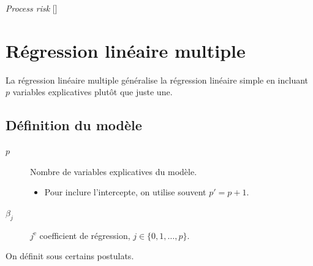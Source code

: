 \documentclass[french]{article}
\begin{document}
\begin{multicols*}{2}
\begin{definitionGENERAL}{\og \textit{Process risk} \fg{}}[]
\begin{center}
\end{center}
\end{definitionGENERAL}




\newpage
\section{Régression linéaire multiple}\label{sec:MLR}
\begin{rappel_enhanced}[Contexte]
La régression linéaire multiple généralise la régression linéaire simple en incluant $p$ variables explicatives plutôt que juste une.
\end{rappel_enhanced}


\subsection{Définition du modèle}
\begin{distributions}[Notation]
\begin{description}
	\item[$p$]	Nombre de variables explicatives du modèle.
		\begin{itemize}
		\item	Pour inclure l'intercepte, on utilise souvent $p' = p + 1$.
		\end{itemize}
	\item[$\beta_{j}$]	$j^{\text{e}}$ coefficient de régression, $j \in \{0, 1, \dots, p\}$.
\end{description}
\end{distributions}

\begin{definitionNOHFILL}
On définit  sous certains postulats. 


\end{definitionNOHFILL}
\end{multicols*}
\end{document}
